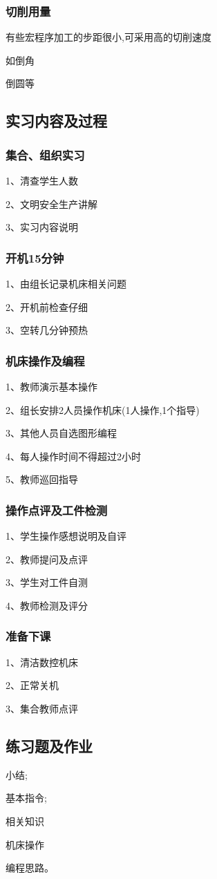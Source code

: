 \subsubsection{切削用量}
有些宏程序加工的步距很小,可采用高的切削速度

如倒角

倒圆等



\subsection{实习内容及过程}

\subsubsection{集合、组织实习}
1、清查学生人数

2、文明安全生产讲解

3、实习内容说明
\subsubsection{开机15分钟}
1、由组长记录机床相关问题

2、开机前检查仔细

3、空转几分钟预热
\subsubsection{机床操作及编程}
1、教师演示基本操作

2、组长安排2人员操作机床(1人操作,1个指导)

3、其他人员自选图形编程

4、每人操作时间不得超过2小时

5、教师巡回指导
\subsubsection{操作点评及工件检测}
1、学生操作感想说明及自评

2、教师提问及点评

3、学生对工件自测

4、教师检测及评分
\subsubsection{准备下课}
1、清洁数控机床

2、正常关机

3、集合教师点评

\subsection{练习题及作业}
\begin{compactenum}[1、]
	\item 小结;
	\item 基本指令;
	\item 相关知识
	\item 机床操作
	\item 编程思路。
\end{compactenum}

